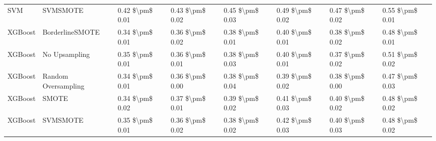 \begin{tabular}{llllllll}
                            SVM &                      SVMSMOTE & 0.42 \$\textbackslash pm\$ 0.01 &           0.43 \$\textbackslash pm\$ 0.02 &       0.45 \$\textbackslash pm\$ 0.03 &        0.49 \$\textbackslash pm\$ 0.02 &                         0.47 \$\textbackslash pm\$ 0.02 &     0.55 \$\textbackslash pm\$ 0.01 \\
                        XGBoost &               BorderlineSMOTE & 0.34 \$\textbackslash pm\$ 0.01 &           0.36 \$\textbackslash pm\$ 0.02 &       0.38 \$\textbackslash pm\$ 0.01 &        0.40 \$\textbackslash pm\$ 0.01 &                         0.38 \$\textbackslash pm\$ 0.02 &     0.48 \$\textbackslash pm\$ 0.01 \\
                        XGBoost &                 No Upsampling & 0.35 \$\textbackslash pm\$ 0.01 &           0.36 \$\textbackslash pm\$ 0.01 &       0.38 \$\textbackslash pm\$ 0.03 &        0.40 \$\textbackslash pm\$ 0.01 &                         0.37 \$\textbackslash pm\$ 0.02 &     0.51 \$\textbackslash pm\$ 0.02 \\
                        XGBoost &           Random Oversampling & 0.34 \$\textbackslash pm\$ 0.01 &           0.36 \$\textbackslash pm\$ 0.00 &       0.38 \$\textbackslash pm\$ 0.04 &        0.39 \$\textbackslash pm\$ 0.02 &                         0.38 \$\textbackslash pm\$ 0.00 &     0.47 \$\textbackslash pm\$ 0.03 \\
                        XGBoost &                         SMOTE & 0.34 \$\textbackslash pm\$ 0.02 &           0.37 \$\textbackslash pm\$ 0.01 &       0.39 \$\textbackslash pm\$ 0.02 &        0.41 \$\textbackslash pm\$ 0.03 &                         0.40 \$\textbackslash pm\$ 0.02 &     0.48 \$\textbackslash pm\$ 0.02 \\
                        XGBoost &                      SVMSMOTE & 0.35 \$\textbackslash pm\$ 0.01 &           0.36 \$\textbackslash pm\$ 0.02 &       0.38 \$\textbackslash pm\$ 0.02 &        0.42 \$\textbackslash pm\$ 0.03 &                         0.40 \$\textbackslash pm\$ 0.03 &     0.48 \$\textbackslash pm\$ 0.02 \\
\bottomrule
\end{tabular}
